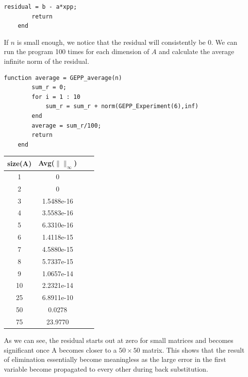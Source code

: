 \documentclass[12pt,letterpaper,reqno]{amsart}
\begin{document}
\begin{enumerate}
\begin{enumerate}
\begin{lstlisting}[mathescape=true]
        residual = b - a*xpp;
        return
    end
    \end{lstlisting}
    \vspace{.15in}
    \begin{flushleft}
    If $n$ is small enough, we notice that the residual will consistently be 0. We can run the program 100 times for each dimension of $A$ and calculate the average infinite norm of the residual.
    \newline
    \end{flushleft}
    \begin{lstlisting}[mathescape=true]
    function average = GEPP_average(n)
        sum_r = 0;
        for i = 1 : 10
            sum_r = sum_r + norm(GEPP_Experiment(6),inf)
        end
        average = sum_r/100;
        return
    end
    \end{lstlisting}
    \begin{center}
    \begin{tabular}{ |c|c|c|c| } 
    \hline
    size(A) & Avg($\|\|_\infty$) \\
    \hline
    1   &   0\\
    2   &   0\\
    3   &   1.5488e-16\\ 
    4   &   3.5583e-16\\
    5   &   6.3310e-16\\
    6   &   1.4118e-15\\
    7   &   4.5880e-15\\
    8   &   5.7337e-15\\
    9   &   1.0657e-14\\
    10  &   2.2321e-14\\
    25  &   6.8911e-10\\
    50  &   0.0278\\
    75  &   23.9770\\
    \hline
    \end{tabular}
    \end{center}
    \vspace{.15in}
    \begin{flushleft}
    As we can see, the residual starts out at zero for small matrices and becomes significant once A becomes closer to a $50 \times 50$ matrix. This shows that the result of elimination essentially become meaningless as the large error in the first variable become propagated to every other during back substitution.
    \newline
    \end{flushleft}

\end{enumerate}
\end{enumerate}
\end{document}
